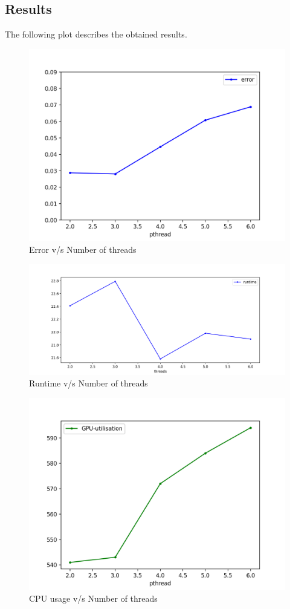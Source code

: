 \documentclass[a4paper]{article}
\begin{document}
\subsection*{Results}
The following plot describes the obtained results.
\begin{figure}[H]
    \centering
    \includegraphics[width=0.5\linewidth]{spatial-pthreads-error.png}
    \caption{Error v/s Number of threads}
    \label{fig:spatial-pthreads-error.png}
\end{figure}
\begin{figure}[H]
    \centering
    \includegraphics[width=0.5\linewidth]{spatial-thread-runtime.png}
    \caption{Runtime v/s Number of threads}
    \label{fig:spatial-thread-runtime.png}
\end{figure}
\begin{figure}[H]
    \centering
    \includegraphics[width=0.5\linewidth]{spatial-pthreads-GPU-utilisation.png}
    \caption{CPU usage v/s Number of threads}
    \label{fig:spatial-pthreads-GPU-utilisation.png}
\end{figure}
\end{document}
